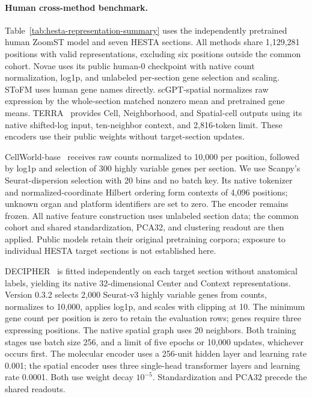 \paragraph{Human cross-method benchmark.}
Table~\ref{tab:hesta-representation-summary} uses the independently pretrained human ZoomST model and seven HESTA sections. All methods share 1,129,281 positions with valid representations, excluding six positions outside the common cohort. Novae uses its public human-0 checkpoint with native count normalization, log1p, and unlabeled per-section gene selection and scaling. SToFM uses human gene names directly. scGPT-spatial normalizes raw expression by the whole-section matched nonzero mean and pretrained gene means. TERRA~\citep{birk2026terra} provides Cell, Neighborhood, and Spatial-cell outputs using its native shifted-log input, ten-neighbor context, and 2,816-token limit. These encoders use their public weights without target-section updates.

CellWorld-base~\citep{liu2026cellworld} receives raw counts normalized to 10,000 per position, followed by log1p and selection of 300 highly variable genes per section. We use Scanpy's Seurat-dispersion selection with 20 bins and no batch key. Its native tokenizer and normalized-coordinate Hilbert ordering form contexts of 4,096 positions; unknown organ and platform identifiers are set to zero. The encoder remains frozen. All native feature construction uses unlabeled section data; the common cohort and shared standardization, PCA32, and clustering readout are then applied. Public models retain their original pretraining corpora; exposure to individual HESTA target sections is not established here.

DECIPHER~\citep{xia2025decipher} is fitted independently on each target section without anatomical labels, yielding its native 32-dimensional Center and Context representations. Version 0.3.2 selects 2,000 Seurat-v3 highly variable genes from counts, normalizes to 10,000, applies log1p, and scales with clipping at 10. The minimum gene count per position is zero to retain the evaluation rows; genes require three expressing positions. The native spatial graph uses 20 neighbors. Both training stages use batch size 256, and a limit of five epochs or 10,000 updates, whichever occurs first. The molecular encoder uses a 256-unit hidden layer and learning rate 0.001; the spatial encoder uses three single-head transformer layers and learning rate 0.0001. Both use weight decay $10^{-5}$. Standardization and PCA32 precede the shared readouts.

